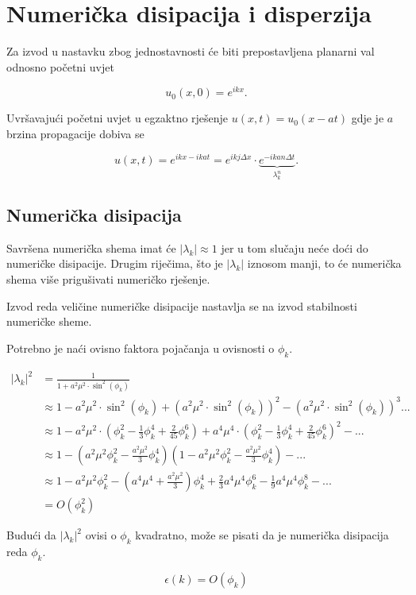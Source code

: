 \documentclass{article}
\begin{document}
\section{Numerička disipacija i disperzija}

Za izvod u nastavku zbog jednostavnosti će biti prepostavljena planarni val
odnosno početni uvjet

\begin{equation}
    u_0(x, 0) = e^{i k x}.
\end{equation}

Uvršavajući početni uvjet u egzaktno rješenje $u(x, t) = u_0(x - at)$ gdje je
$a$ brzina propagacije dobiva se

\begin{equation}
    u(x, t) = e^{i k x - i k a t} =
              e^{i k j \Delta x} \cdot
              \underbrace{e^{-i k a n \Delta t}}_{\lambda_k^n}.
\end{equation}


\subsection{Numerička disipacija}

Savršena numerička shema imat će $|\lambda_k| \approx 1$ jer u tom slučaju neće
doći do numeričke disipacije. Drugim riječima, što je $|\lambda_k|$ iznosom
manji, to će numerička shema više prigušivati numeričko rješenje.

Izvod reda veličine numeričke disipacije nastavlja se na izvod stabilnosti
numeričke sheme.

Potrebno je naći ovisno faktora pojačanja u ovisnosti o $\phi_k$.

\begin{align*}
    |\lambda_k|^2 &= \frac{1}{1 + a^2 \mu^2 \cdot \sin^2(\phi_k)} \\
    &\approx 1 - a^2 \mu ^2 \cdot \sin^2(\phi_k) +
        \left(a^2 \mu ^2 \cdot \sin^2(\phi_k)\right)^2 -
        \left(a^2 \mu ^2 \cdot \sin^2(\phi_k)\right)^3... \\
    &\approx 1 -
        a^2 \mu^2 \cdot
        \left(\phi_k^2 - \frac{1}{3} \phi_k^4 + \frac{2}{45} \phi_k^6\right) +
        a^4 \mu^4 \cdot
        \left(\phi_k^2 - \frac{1}{3} \phi_k^4 + \frac{2}{45} \phi_k^6\right)^2
        - ... \\
    &\approx 1 -
        \left(a^2 \mu^2 \phi_k^2 - \frac{a^2 \mu^2}{3} \phi_k^4\right)
        \left(1 - a^2 \mu^2 \phi_k^2 - \frac{a^2 \mu^2}{3} \phi_k^4\right)
        - ... \\
    &\approx 1 - a^2\mu^2 \phi_k^2 -
        \left(a^4 \mu^4 + \frac{a^2 \mu^2}{3}\right) \phi_k^4
        + \frac{2}{3} a^4 \mu^4 \phi_k^6 - \frac{1}{9}a^4 \mu^4 \phi_k^8
        - ... \\
    &= O\left(\phi_k^2\right)
\end{align*}

Budući da $|\lambda_k|^2$ ovisi o $\phi_k$ kvadratno, može se pisati da je
numerička disipacija reda $\phi_k$.

\begin{equation}
    \epsilon(k) = O(\phi_k)
\end{equation}
\end{document}
